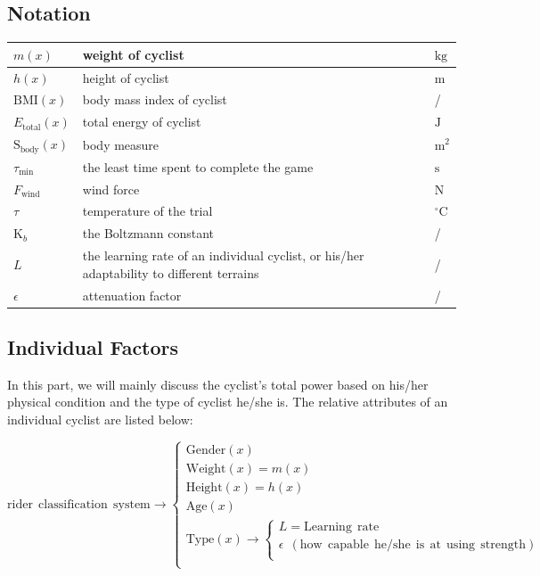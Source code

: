\documentclass{article}
\begin{document}
		\subsection{Notation}
			\begin{tabular}{|l|l|l|}
				\hline
				$m( x )$&weight of cyclist&$\mathrm{kg}$\\
				\hline
				$ h ( x )$&height of cyclist&$\mathrm{m}$\\
				\hline
				$\mathrm{BMI}( x )$&body mass index of cyclist&/\\
				\hline
				$ E _\mathrm{total} ( x )$&total energy of cyclist&$\mathrm{J}$\\
				\hline
				$\mathrm{S}_\mathrm{body}( x )$&body measure&$\mathrm{m}^2$\\
				\hline
				$\tau_{\mathrm{min}}$&the least time spent to complete the game&$\mathrm{s}$\\
				\hline
				$F_\mathrm{wind}$&wind force&$\mathrm{N}$\\
				\hline
				$\tau$&temperature of the trial&$^\circ\mathrm{C}$\\
				\hline
				$\mathrm{K}_ b $&the Boltzmann constant&/\\
				\hline
				\(L\) & the learning rate of an individual cyclist, or his/her adaptability to different terrains & /\\
				\hline
				\(\epsilon\) & attenuation factor & /\\
				\hline
			\end{tabular}
		\subsection{Individual Factors}
			In this part, we will mainly discuss the cyclist's total power based on his/her physical condition and the type of cyclist he/she is. The relative attributes of an individual cyclist are listed below:

			\[\boxed{\mathrm{rider\:\:classification\:\:system}} \rightarrow \begin{cases}
				\mathrm{Gender}\left( x \right)\\
				\mathrm{Weight}\left( x \right)=m(x)\\
				\mathrm{Height}\left( x \right)=h(x)\\
				\mathrm{Age}\left( x \right)\\
				\mathrm{Type}\left( x \right) \rightarrow \begin{cases}
				L=\mathrm{Learning}\:\:\mathrm{rate}\\
				\epsilon\:\:(\mathrm{how\:\:capable\:\:he/she\:\:is\:\:at\:\:using\:\:strength})\\
			\end{cases}\\
			\end{cases}\]
\end{document}
